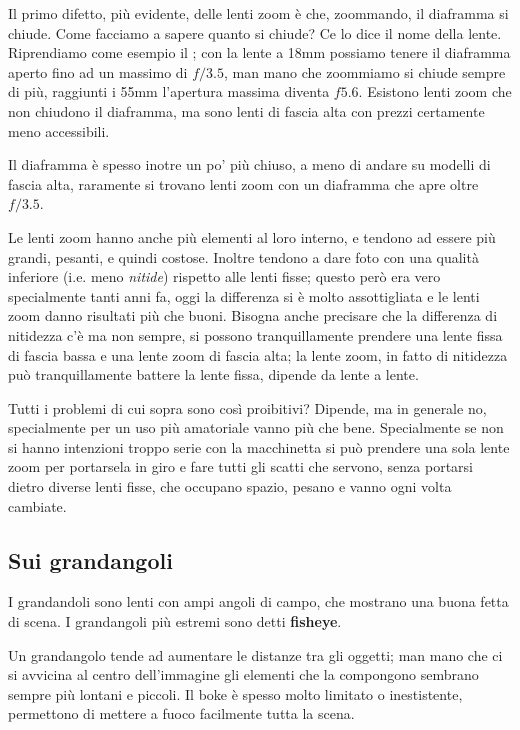 Il primo difetto, più evidente, delle lenti zoom è che, zoommando, il diaframma si chiude. Come facciamo a sapere quanto si chiude? Ce lo dice il nome della lente.\newline
Riprendiamo come esempio il ; con la lente a 18mm possiamo tenere il diaframma aperto fino ad un massimo di $f/3.5$, man mano che zoommiamo si chiude sempre di più, raggiunti i 55mm l'apertura massima diventa $f5.6$. Esistono lenti zoom che non chiudono il diaframma, ma sono lenti di fascia alta con prezzi certamente meno accessibili.

Il diaframma è spesso inotre un po' più chiuso, a meno di andare su modelli di fascia alta, raramente si trovano lenti zoom con un diaframma che apre oltre $f/3.5$.

Le lenti zoom hanno anche più elementi al loro interno, e tendono ad essere più grandi, pesanti, e quindi costose.
Inoltre tendono a dare foto con una qualità inferiore (i.e. meno \textit{nitide}) rispetto alle lenti fisse; questo però era vero specialmente tanti anni fa, oggi la differenza si è molto assottigliata e le lenti zoom danno risultati più che buoni.
Bisogna anche precisare che la differenza di nitidezza c'è ma non sempre, si possono tranquillamente prendere una lente fissa di fascia bassa e una lente zoom di fascia alta; la lente zoom, in fatto di nitidezza può tranquillamente battere la lente fissa, dipende da lente a lente.

Tutti i problemi di cui sopra sono così proibitivi? Dipende, ma in generale no, specialmente per un uso più amatoriale vanno più che bene. Specialmente se non si hanno intenzioni troppo serie con la macchinetta si può prendere una sola lente zoom per portarsela in giro e fare tutti gli scatti che servono, senza portarsi dietro diverse lenti fisse, che occupano spazio, pesano e vanno ogni volta cambiate.


\subsection{Sui grandangoli} \label{subsec:suigrandandoli}
I grandandoli sono lenti con ampi angoli di campo, che mostrano una buona fetta di scena. I grandangoli più estremi sono detti \textbf{fisheye}.

Un grandangolo tende ad aumentare le distanze tra gli oggetti; man mano che ci si avvicina al centro dell'immagine gli elementi che la compongono sembrano sempre più lontani e piccoli.
Il boke è spesso molto limitato o inestistente, permettono di mettere a fuoco facilmente tutta la scena.

